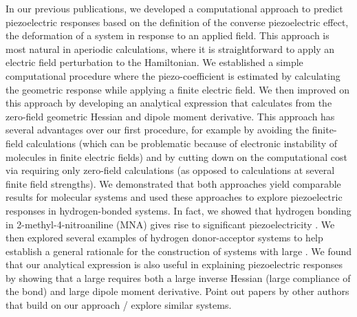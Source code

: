In our previous publications, we developed a computational approach to predict piezoelectric responses 
based on the definition of the converse piezoelectric effect, the deformation of a system in
response to an applied field. 
This approach is most natural in aperiodic calculations, where it is straightforward to apply an
electric field perturbation to the Hamiltonian. 
We established a simple computational procedure where the piezo-coefficient \dtt{} is
estimated by calculating the geometric response while applying a finite electric field. 
We then improved on this approach by developing an analytical expression that calculates \dtt{} from the zero-field 
geometric Hessian and dipole moment derivative. 
This approach has several advantages over our first procedure, for example by avoiding the
finite-field calculations (which can be problematic because of electronic instability of molecules in finite electric
fields) \cite{Yamabe1977, raey, raey1,raey2} and by cutting down on the computational cost via requiring only zero-field calculations (as opposed to
calculations at several finite field strengths). 
We demonstrated that both approaches yield comparable results for
molecular systems and used these approaches to explore piezoelectric responses in hydrogen-bonded systems. 
In fact, we showed that hydrogen bonding in 2-methyl-4-nitroaniline (MNA) gives rise to significant
piezoelectricity \cite{Werling1}. 
We then explored several examples of hydrogen donor-acceptor systems to help establish a general
rationale for the construction of systems with large \dtt{}. 
We found that our analytical expression is also useful in explaining piezoelectric responses by showing that a large \dtt{} requires both a large 
inverse Hessian (large compliance of the bond) and large dipole moment derivative. 
Point out papers by other authors that build on our approach / explore similar systems. 

